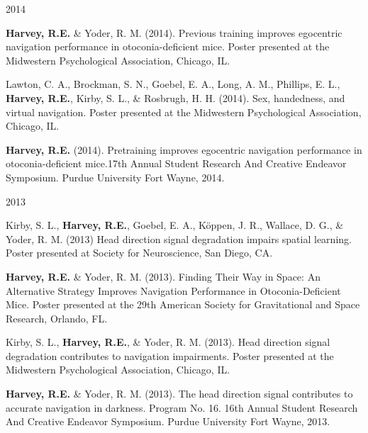 \begin{cventries}
\cventry
    {} %
    {} %
    {} %
    {2014} %
    {
      \begin{cvitems} %
      \setlength\itemsep{0.35em}
        \item {\textbf{Harvey, R.E.} \& Yoder, R. M. (2014). Previous training improves egocentric navigation performance in otoconia-deficient mice. Poster presented at the Midwestern Psychological Association, Chicago, IL.}
        \item {Lawton, C. A., Brockman, S. N., Goebel, E. A., Long, A. M., Phillips, E. L., \textbf{Harvey, R.E.}, Kirby, S. L., \& Rosbrugh, H. H. (2014). Sex, handedness, and virtual navigation. Poster presented at the Midwestern Psychological Association, Chicago, IL.}
        \item {\textbf{Harvey, R.E.} (2014). Pretraining improves egocentric navigation performance in otoconia-deficient mice.17th Annual Student Research And Creative Endeavor Symposium. Purdue University Fort Wayne, 2014.}
      \end{cvitems}
    }
\end{cventries}

\begin{cventries}
\cventry
    {} %
    {} %
    {} %
    {2013} %
    {
      \begin{cvitems} %
      \setlength\itemsep{0.35em}
        \item {Kirby, S. L., \textbf{Harvey, R.E.}, Goebel, E. A., Köppen, J. R., Wallace, D. G., \& Yoder, R. M. (2013) Head direction signal degradation impairs spatial learning. Poster presented at Society for Neuroscience, San Diego, CA.}
        \item {\textbf{Harvey, R.E.} \& Yoder, R. M. (2013). Finding Their Way in Space: An Alternative Strategy Improves Navigation Performance in Otoconia-Deficient Mice. Poster presented at the 29th American Society for Gravitational and Space Research, Orlando, FL.}
        \item {Kirby, S. L., \textbf{Harvey, R.E.}, \& Yoder, R. M. (2013). Head direction signal degradation contributes to navigation impairments. Poster presented at the Midwestern Psychological Association, Chicago, IL.}
        \item {\textbf{Harvey, R.E.} \& Yoder, R. M. (2013). The head direction signal contributes to accurate navigation in darkness. Program No. 16. 16th Annual Student Research And Creative Endeavor Symposium. Purdue University Fort Wayne, 2013.}
      \end{cvitems}
    }
\end{cventries}